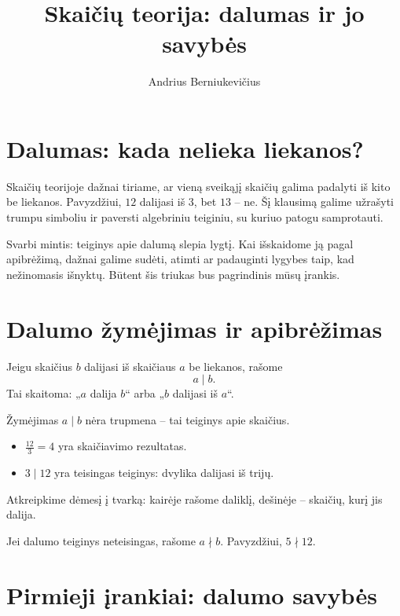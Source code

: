 \documentclass[11pt,a4paper]{scrartcl}
\title{Skaičių teorija: dalumas ir jo savybės}
\author{Andrius Berniukevičius}
\begin{document}
\maketitle

\section{Dalumas: kada nelieka liekanos?}

Skaičių teorijoje dažnai tiriame, ar vieną sveikąjį skaičių galima padalyti iš kito be liekanos. Pavyzdžiui, $12$ dalijasi iš $3$, bet $13$ – ne. Šį klausimą galime užrašyti trumpu simboliu ir paversti algebriniu teiginiu, su kuriuo patogu samprotauti.

Svarbi mintis: teiginys apie dalumą slepia lygtį. Kai išskaidome ją pagal apibrėžimą, dažnai galime sudėti, atimti ar padauginti lygybes taip, kad nežinomasis išnyktų. Būtent šis triukas bus pagrindinis mūsų įrankis.

\section{Dalumo žymėjimas ir apibrėžimas}

Jeigu skaičius \(b\) dalijasi iš skaičiaus \(a\) be liekanos, rašome
\begin{equation*}
    a\mid b.
\end{equation*}
Tai skaitoma: „\(a\) dalija \(b\)“ arba „\(b\) dalijasi iš \(a\)“.

\begin{remark*}
Žymėjimas \(a\mid b\) nėra trupmena – tai teiginys apie skaičius.
\begin{itemize}
    \item \(\frac{12}{3}=4\) yra skaičiavimo rezultatas.
    \item \(3\mid12\) yra teisingas teiginys: dvylika dalijasi iš trijų.
\end{itemize}
Atkreipkime dėmesį į tvarką: kairėje rašome daliklį, dešinėje – skaičių, kurį jis dalija.
\end{remark*}

Jei dalumo teiginys neteisingas, rašome \(a\nmid b\). Pavyzdžiui, \(5\nmid12\).

\section{Pirmieji įrankiai: dalumo savybės}
\end{document}
